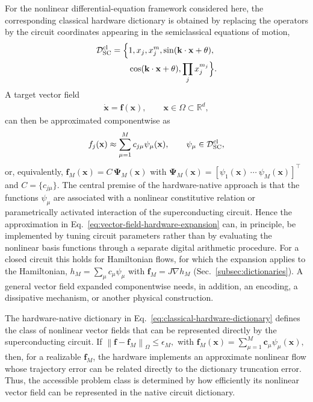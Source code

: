 \documentclass[pra,twocolumn,superscriptaddress,nofootinbib,floatfix]{revtex4-2}
\theoremstyle{remark}
\newcommand{\revcolor}{\color{blue}}
\DeclareRobustCommand{\rev}[1]{{\revcolor #1}}
\begin{document}
For the nonlinear differential-equation framework considered here, the corresponding classical hardware dictionary is obtained by replacing the operators by the circuit coordinates appearing in the semiclassical equations of motion,
\begin{align}
\mathcal D_{\rm SC}^{\rm cl}=\Big\{&1,x_j,x_j^m,\sin(\mathbf k\cdot\mathbf x+\theta),\nonumber\\
&\cos(\mathbf k\cdot\mathbf x+\theta),\prod_j x_j^{m_j}\Big\}.
\label{eq:classical-hardware-dictionary}
\end{align}
A target vector field
\begin{align}
\dot{\mathbf x} = \mathbf f(\mathbf x), \qquad \mathbf x\in\Omega\subset\mathbb R^d,
\label{eq:general-nonlinear-system}
\end{align}
\rev{can then be approximated componentwise as}
\begingroup\revcolor
\begin{align}
f_j(\mathbf x)\approx\sum_{\mu=1}^{M}c_{j\mu}\psi_\mu(\mathbf x),\qquad\psi_\mu\in\mathcal D_{\rm SC}^{\rm cl},
\label{eq:vector-field-hardware-expansion}
\end{align}
\endgroup
\rev{or, equivalently, \(\mathbf f_M(\mathbf x) = C\,\boldsymbol{\Psi}_M(\mathbf x)\) with \(\boldsymbol{\Psi}_M(\mathbf x) = [\psi_1(\mathbf x)\ \cdots\ \psi_M(\mathbf x) ]^\top\) and \(C=\{c_{j\mu}\}\).} The central premise of the hardware-native approach is that the functions \(\psi_\mu\) are associated with a nonlinear constitutive relation or parametrically activated interaction of the superconducting circuit. Hence the approximation in Eq.~\eqref{eq:vector-field-hardware-expansion} can, in principle, be implemented by tuning circuit parameters rather than by evaluating the nonlinear basis functions through a separate digital arithmetic procedure. \rev{For a closed circuit this holds for Hamiltonian flows, for which the expansion applies to the Hamiltonian, \(h_M=\sum_\mu c_\mu\psi_\mu\) with \(\mathbf f_M=J\nabla h_M\) (Sec.~\ref{subsec:dictionaries}).} \rev{A general vector field expanded componentwise needs, in addition, an encoding, a dissipative mechanism, or another physical construction.}

The hardware-native dictionary in Eq.~\eqref{eq:classical-hardware-dictionary} defines the class of nonlinear vector fields that can be represented directly by the superconducting circuit. \rev{If \(\left\|\mathbf f-\mathbf f_M\right\|_{\Omega}\leq\epsilon_M,\) with \(\mathbf f_M(\mathbf x)=\sum_{\mu=1}^{M}\mathbf c_{\mu}\psi_{\mu}(\mathbf x),\) then, for a realizable \(\mathbf f_M\), the hardware implements an approximate nonlinear flow whose trajectory error can be related directly to the dictionary truncation error.} Thus, the accessible problem class is determined by how efficiently its nonlinear vector field can be represented in the native circuit dictionary.
\end{document}
